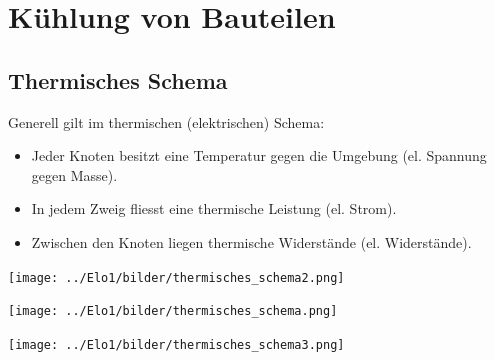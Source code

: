 \newpage

	\section{Kühlung von Bauteilen }
	
	\subsection{Thermisches Schema }
		Generell gilt im thermischen (elektrischen) Schema: 
		\begin{itemize}
	      \item Jeder Knoten besitzt eine Temperatur gegen die Umgebung (el. Spannung gegen Masse).
	      \item In jedem Zweig fliesst eine thermische Leistung (el. Strom).
	      \item Zwischen den Knoten liegen thermische Widerstände (el. Widerstände).
    \end{itemize}   
    
		\begin{center}
	  		\texttt{[image: ../Elo1/bilder/thermisches\_schema2.png]} \\
	  	\end{center}

		\begin{center}
	  		\texttt{[image: ../Elo1/bilder/thermisches\_schema.png]} \\
	  	\end{center} 
    
		\begin{center}
	  		\texttt{[image: ../Elo1/bilder/thermisches\_schema3.png]}
	  	\end{center}



